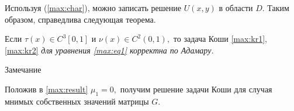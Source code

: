 Используя (\ref{max:char}), можно записать решение $U(x,y)$ в области $D$. Таким образом, справедлива следующая  теорема.



\begin{theorem} Если $\tau(x)\in C^{3} [0, 1]$ и $\nu(x)\in C^{2} (0, 1),$ то задача Коши \rm \eqref{max:kr1}, \eqref{max:kr2} \it  для уравнения \eqref{max:eq1} корректна по Адамару\rm.

\end{theorem}



\begin{newthm}{Замечание} 

Положив в \eqref{max:result} $\mu_1=0,$ получим решение задачи Коши для случая мнимых собственных значений матрицы $G.$

\end{newthm}



\vspace{-3mm}



